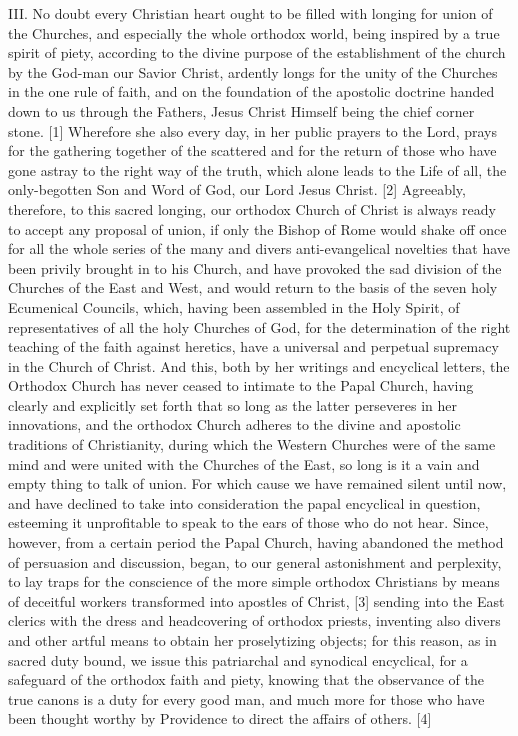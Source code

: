 III. No doubt every Christian heart ought to be filled with longing for
union of the Churches, and especially the whole orthodox world, being
inspired by a true spirit of piety, according to the divine purpose of
the establishment of the church by the God-man our Savior Christ,
ardently longs for the unity of the Churches in the one rule of faith,
and on the foundation of the apostolic doctrine handed down to us
through the Fathers, \textquotesingle Jesus Christ Himself being the
chief corner stone.\textquotesingle{} {[}1{]} Wherefore she also every
day, in her public prayers to the Lord, prays for the gathering together
of the scattered and for the return of those who have gone astray to the
right way of the truth, which alone leads to the Life of all, the
only-begotten Son and Word of God, our Lord Jesus Christ. {[}2{]}
Agreeably, therefore, to this sacred longing, our orthodox Church of
Christ is always ready to accept any proposal of union, if only the
Bishop of Rome would shake off once for all the whole series of the many
and divers anti-evangelical novelties that have been
\textquotesingle privily brought in\textquotesingle{} to his Church, and
have provoked the sad division of the Churches of the East and West, and
would return to the basis of the seven holy Ecumenical Councils, which,
having been assembled in the Holy Spirit, of representatives of all the
holy Churches of God, for the determination of the right teaching of the
faith against heretics, have a universal and perpetual supremacy in the
Church of Christ. And this, both by her writings and encyclical letters,
the Orthodox Church has never ceased to intimate to the Papal Church,
having clearly and explicitly set forth that so long as the latter
perseveres in her innovations, and the orthodox Church adheres to the
divine and apostolic traditions of Christianity, during which the
Western Churches were of the same mind and were united with the Churches
of the East, so long is it a vain and empty thing to talk of union. For
which cause we have remained silent until now, and have declined to take
into consideration the papal encyclical in question, esteeming it
unprofitable to speak to the ears of those who do not hear. Since,
however, from a certain period the Papal Church, having abandoned the
method of persuasion and discussion, began, to our general astonishment
and perplexity, to lay traps for the conscience of the more simple
orthodox Christians by means of deceitful workers transformed into
apostles of Christ, {[}3{]} sending into the East clerics with the dress
and headcovering of orthodox priests, inventing also divers and other
artful means to obtain her proselytizing objects; for this reason, as in
sacred duty bound, we issue this patriarchal and synodical encyclical,
for a safeguard of the orthodox faith and piety, knowing
\textquotesingle that the observance of the true canons is a duty for
every good man, and much more for those who have been thought worthy by
Providence to direct the affairs of others.\textquotesingle{} {[}4{]}

